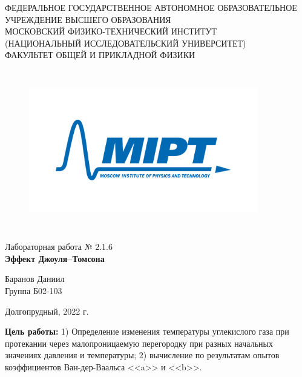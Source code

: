 \documentclass[a4paper,12pt]{article} %
\begin{document}
\begin{center}
	\footnotesize{ФЕДЕРАЛЬНОЕ ГОСУДАРСТВЕННОЕ АВТОНОМНОЕ ОБРАЗОВАТЕЛЬНОЕ 			УЧРЕЖДЕНИЕ ВЫСШЕГО ОБРАЗОВАНИЯ}\\
	\footnotesize{МОСКОВСКИЙ ФИЗИКО-ТЕХНИЧЕСКИЙ ИНСТИТУТ\\(НАЦИОНАЛЬНЫЙ 			ИССЛЕДОВАТЕЛЬСКИЙ УНИВЕРСИТЕТ)}\\
	\footnotesize{ФАКУЛЬТЕТ ОБЩЕЙ И ПРИКЛАДНОЙ ФИЗИКИ\\}
	\hfill \break
	\hfill \break
	\hfill \break
	\hfill \break
\end{center}


\begin{figure}[h]
    \centering
    \includegraphics*[width=10cm,height=7cm,keepaspectratio]{mipt_eng_text_png.png}
    \label{fig:my_label}
\end{figure}


\begin{center}   
    \hfill \break
	\hfill \break
	\hfill \break
	\hfill \break
	\large{Лабораторная работа № 2.1.6\\\textbf{Эффект Джоуля--Томсона}}\\
	\hfill \break
	\hfill \break
	\hfill \break
	\hfill \break
	\begin{flushright}
		Баранов Даниил\\
		Группа Б02-103
	\end{flushright}
	\hfill \break
	\hfill \break
	\hfill \break
\end{center}
\hfill \break
\hfill \break
\hfill \break
\hfill \break
\begin{center}
	Долгопрудный, 2022 г.
\end{center}
\thispagestyle{empty}



\newpage

\textbf{Цель работы:}
 1) Определение изменения температуры углекислого газа при протекании через малопроницаемую перегородку при разных начальных значениях давления и температуры; 2) вычисление по результатам опытов коэффициентов Ван-дер-Ваальса <<a>> и <<b>>.
\end{document}
